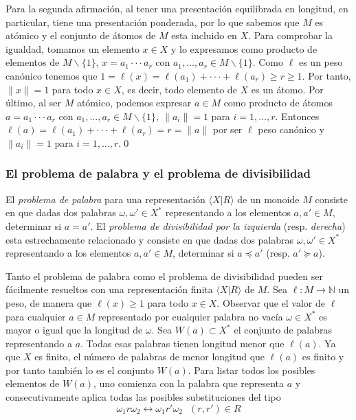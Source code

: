 \documentclass[12pt]{article}
\theoremstyle{definition}
\providecommand{\norm}[1]{\lVert#1\rVert}
\begin{document}
Para la segunda afirmación, al tener una presentación equilibrada en longitud, en particular, tiene una presentación ponderada, por lo que sabemos que $M$ es atómico y el conjunto de átomos de $M$ esta incluido en $X$. Para comprobar la igualdad, tomamos un elemento $x\in X$ y lo expresamos como producto de elementos de $M\backslash\{1\}$, $x = a_1\cdot\cdot\cdot a_r$ con $a_1,...,a_r\in M\backslash\{1\}$. Como $\ell$ es un peso canónico tenemos que $1=\ell(x)=\ell(a_1)+\cdot\cdot\cdot+\ell(a_r)\geq r\geq 1$. Por tanto, $\norm{x}=1$ para todo $x\in X$, es decir, todo elemento de $X$ es un átomo. Por último, al ser $M$ atómico, podemos expresar $a\in M$ como producto de átomos $a =a_1\cdot\cdot\cdot a_r$ con $a_1,...,a_r\in M\backslash\{1\},\ \norm{a_i}=1$  para $i=1,\ldots,r$. Entonces $\ell(a)=\ell(a_1)+\cdot\cdot\cdot+\ell(a_r) = r = \norm{a}$ por ser $\ell$ peso canónico y $\norm{a_i}=1$ para $i=1,\ldots,r$.\qed

\subsubsection{El problema de palabra y el problema de divisibilidad}

El \textit{problema de palabra} para una representación $\langle X|R\rangle$ de un monoide $M$ consiste en que dadas dos palabras $\omega,\omega'\in X^*$ representando a los elementos $a,a'\in M$, determinar si $a=a'$. El \textit{problema de divisibilidad por la izquierda} (resp. \textit{derecha}) esta estrechamente relacionado y consiste en que dadas
dos palabras $\omega,\omega'\in X^*$ representando a los elementos $a,a'\in M$, determinar si $a\preceq a'$ (resp. $a'\succeq a$).

Tanto el problema de palabra como el problema de divisibilidad pueden ser fácilmente resueltos con una representación finita $\langle X|R\rangle$ de $M$. Sea $\ell:M\rightarrow\mathbb{N}$ un peso, de manera que $\ell(x)\geq 1$ para todo $x\in X$. Observar que el valor de $\ell$ para cualquier $a\in M$ representado por cualquier palabra no vacía $\omega\in X^*$ es mayor o igual que la longitud de $\omega$. Sea $W(a)\subset X^*$ el conjunto de palabras representando a $a$. Todas esas palabras tienen longitud menor que $\ell(a)$. Ya que $X$ es finito, el número de palabras de menor longitud que $\ell(a)$ es finito y por tanto también lo es el conjunto $W(a)$. Para listar todos los posibles elementos de $W(a)$, uno comienza con la palabra que representa $a$ y consecutivamente aplica todas las posibles substituciones del tipo
$$\omega_1 r\omega_2\leftrightarrow \omega_1 r'\omega_2\ \ \ (r,r')\in R$$
\end{document}
